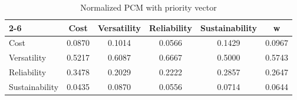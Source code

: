 \begin{table}[h!]
\centering
\caption{Normalized PCM with priority vector}
\renewcommand{\arraystretch}{1.2}

\begin{tabular}{|l||c|c|c|c||c|}
\cline{2-6}
\multicolumn{1}{r||}{} 
& Cost & Versatility & Reliability & Sustainability & \textbf{w} \\
\hline\hline

Cost           & 0.0870 & 0.1014 & 0.0566 & 0.1429 & 0.0967 \\\hline
Versatility    & 0.5217 & 0.6087 & 0.6667 & 0.5000 & 0.5743 \\\hline
Reliability    & 0.3478 & 0.2029 & 0.2222 & 0.2857 & 0.2647 \\\hline
Sustainability & 0.0435 & 0.0870 & 0.0556 & 0.0714 & 0.0644 \\\hline

\end{tabular}
\label{tab:pcm_norm}
\end{table}

